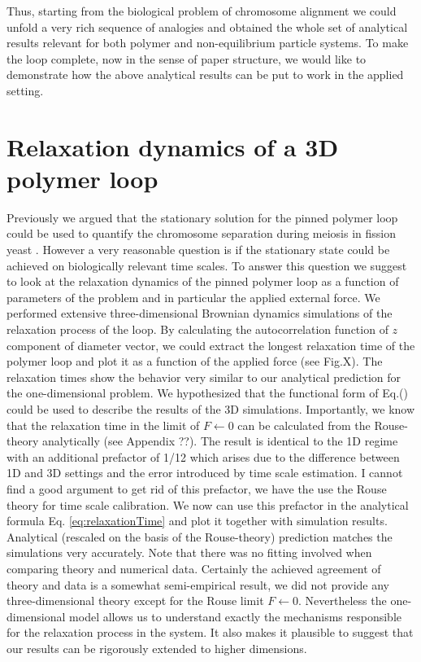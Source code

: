 \documentclass[aps,showpacs,twocolumn,floatfix,prx,superscriptaddress]{revtex4-1}
\begin{document}
Thus, starting from the biological problem of chromosome alignment we could unfold a very rich sequence of analogies and obtained the whole set of analytical results relevant for both polymer and non-equilibrium particle systems. To make the loop complete, now in the sense of paper structure, we would like to demonstrate how the above analytical results can be put to work in the applied setting.


\section{Relaxation dynamics of a 3D polymer loop}
Previously we argued that the stationary solution for the pinned polymer loop could be used to quantify the chromosome separation during meiosis in fission yeast \cite{}. However a very reasonable question is if the stationary state could be achieved on biologically relevant time scales. To answer this question we suggest to look at the relaxation dynamics of the pinned polymer loop as a function of parameters of the problem and in particular the applied external force. We performed extensive three-dimensional Brownian dynamics simulations of the relaxation process of the loop. By calculating the autocorrelation function of $z$ component of diameter vector, we could extract the longest relaxation time of the polymer loop and plot it as a function of the applied force (see Fig.X). The relaxation times show the behavior very similar to our analytical prediction for the one-dimensional problem. We hypothesized that the functional form of Eq.() could be used to describe the results of the 3D simulations. Importantly, we know that the relaxation time in the limit of $F\leftarrow 0$ can be calculated from the Rouse-theory analytically (see Appendix ??).  The result is identical to the 1D regime with an additional prefactor of 1/12 which arises due to the difference between 1D and 3D settings and the error introduced by time scale estimation. {\color{red} I cannot find a good argument to get rid of this prefactor, we have the use the Rouse theory for time scale calibration.} We now can use this prefactor in the analytical formula Eq. \eqref{eq:relaxationTime} and plot it together with simulation results. Analytical (rescaled on the basis of the Rouse-theory) prediction matches the simulations very accurately. Note that there was no fitting involved when comparing theory and numerical data. Certainly the achieved agreement of theory and data is a somewhat semi-empirical result, we did not provide any three-dimensional theory except for the Rouse limit $F\leftarrow 0$. Nevertheless the one-dimensional model allows us to understand exactly the mechanisms responsible for the relaxation process in the system. It also makes it plausible to suggest that our results can be rigorously extended to higher dimensions.
\end{document}
